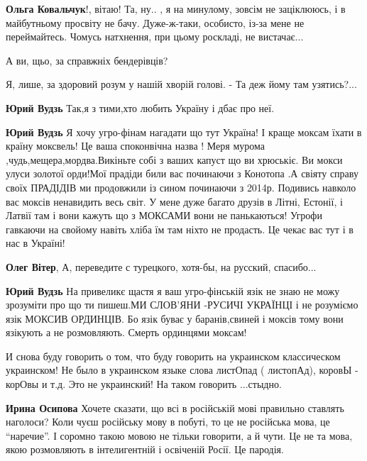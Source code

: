 \begin{itemize}
\begin{itemize}

\textbf{Ольга Ковальчук}!, вітаю!  Та, ну.. , я на минулому, зовсім не заціклююсь, і в
майбутньому просвіту не бачу. Дуже-ж-таки, особисто, із-за мене не
переймайтесь.  Чомусь натхнення, при цьому роскладі, не вистачає...

А ви, щьо, за справжніх бендерівців?

Я, лише, за здоровий розум у нашій хворій голові.
- Та деж йому там узятись?...

\textbf{Юрий Вудзь} Так,я з тими,хто любить Україну і дбає про неї.

\textbf{Юрий Вудзь} Я хочу угро-фінам нагадати що тут Україна! І краще моксам
їхати в країну моксвель! Це ваша споконвічна назва ! Меря мурома
,чудь,мещера,мордва.Викіньте собі з ваших капуст що ви хрюськіє. Ви мокси улуси
золотої орди!Мої прадіди били вас починаючи з Конотопа .А свіяту справу своїх
ПРАДІДІВ ми продовжили із сином починаючи з 2014р. Подивись навколо вас моксів
ненавидить весь світ. У мене дуже багато друзів в Літні, Естонії, і Латвії там
і вони кажуть що з МОКСАМИ вони не панькаються! Угрофи гавкаючи на свойому
навіть хліба їм там ніхто не продасть. Це чекає вас тут і в нас в Україні!

\textbf{Олег Вітер},
А, переведите с турецкого, хотя-бы, на русский, спасибо...

\textbf{Юрий Вудзь} На привеликє щастя я ваш угро-фінській язік не знаю не можу
зрозуміти про що ти пишеш.МИ СЛОВ'ЯНИ -РУСИЧІ УКРАЇНЦІ і не розуміємо язік
МОКСИВ ОРДИНЦІВ. Бо язік буває у баранів,свиней і моксів тому вони язікують а
не розмовляють. Смерть ординцями моксам!
\end{itemize}


И снова буду говорить о том, что буду говорить на украинском классическом
украинском! Не было в украинском языке слова листОпад ( листопАд), коровЫ -
корОвы и т.д. Это не украинский! На таком говорить ...стыдно.

\begin{itemize}

\textbf{Ирина Осипова} Хочете сказати, що всі в російській мові правильно ставлять
наголоси? Коли чуєш російську мову в побуті, то це не російська мова, це
\enquote{наречие}. І соромно такою мовою не тільки говорити, а й чути. Це не та мова,
якою розмовляють в інтелигентній і освіченій Росії. Це пародія.


\end{itemize}
\end{itemize}
